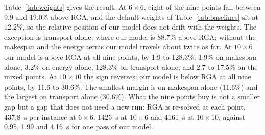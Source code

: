 Table~\ref{tab:weights} gives the result. At $6\times6$, eight of the nine
points fall between 9.9 and 19.0\% above RGA, and the default weights of
Table~\ref{tab:baselines} sit at 12.2\%, so the relative position of our model
does not drift with the weights. The exception is transport alone, where our
model is 88.7\% above RGA; without the makespan and the energy terms our model
travels about twice as far. At $10\times6$ our model is above RGA at all nine
points, by 1.9 to 128.3\%: 1.9\% on makespan alone, 3.2\% on energy alone,
128.3\% on transport alone, and 2.7 to 17.5\% on the mixed points. At
$10\times10$ the sign reverses: our model is
below RGA at all nine points, by 11.6 to 30.6\%. The smallest margin is on
makespan alone (11.6\%) and the largest on transport alone (30.6\%). What the
nine points buy is not a smaller gap but a gap that does not need a new run:
RGA is re-solved at each point, 437.8~s per instance at $6\times6$, 1426~s at
$10\times6$ and 4161~s at $10\times10$, against 0.95, 1.99 and 4.16~s for one
pass of our model.
